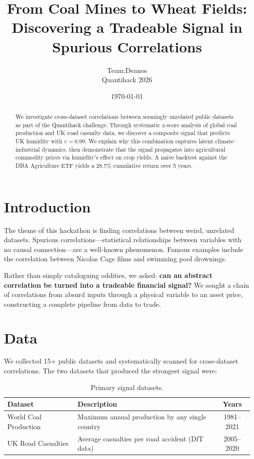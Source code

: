 \documentclass[12pt,a4paper]{article}
\title{\textbf{From Coal Mines to Wheat Fields:} \\ \large Discovering a Tradeable Signal in Spurious Correlations}
\author{Team:Deanos \\ Quantihack 2026}
\date{\today}
\begin{document}
\maketitle

\begin{abstract}
We investigate cross-dataset correlations between seemingly unrelated public datasets as part of the Quantihack challenge. Through systematic z-score analysis of global coal production and UK road casualty data, we discover a composite signal that predicts UK humidity with $r = 0.99$. We explain why this combination captures latent climate--industrial dynamics, then demonstrate that the signal propagates into agricultural commodity prices via humidity's effect on crop yields. A naive backtest against the DBA Agriculture ETF yields a 28.7\% cumulative return over 5 years.
\end{abstract}

\section{Introduction}

The theme of this hackathon is finding correlations between weird, unrelated datasets. Spurious correlations---statistical relationships between variables with no causal connection---are a well-known phenomenon. Famous examples include the correlation between Nicolas Cage films and swimming pool drownings.

Rather than simply cataloguing oddities, we asked: \textbf{can an abstract correlation be turned into a tradeable financial signal?} We sought a chain of correlations from absurd inputs through a physical variable to an asset price, constructing a complete pipeline from data to trade.

\section{Data}

We collected 15+ public datasets and systematically scanned for cross-dataset correlations. The two datasets that produced the strongest signal were:

\begin{table}[H]
\centering
\begin{tabular}{@{}llc@{}}
\toprule
\textbf{Dataset} & \textbf{Description} & \textbf{Years} \\
\midrule
World Coal Production & Maximum annual production by any single country & 1981--2021 \\
UK Road Casualties & Average casualties per road accident (DfT data) & 2005--2020 \\
\bottomrule
\end{tabular}
\caption{Primary signal datasets.}
\end{table}
\end{document}
